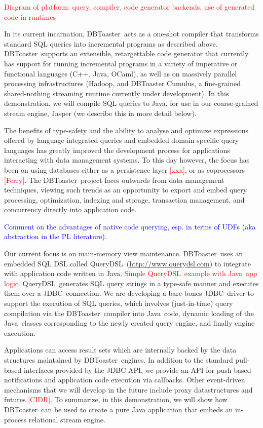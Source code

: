 \documentclass{vldb}
\newcommand{\tinysection}[1]{\noindent{\bf #1.}}
\newcommand{\todo}[1]{\textcolor{red}{#1}}
\newcommand{\note}[1]{\textcolor{blue}{#1}}
\newcommand{\compiler}{DBToaster}
\newcommand{\driver}{JDBC}
\newcommand{\targetlang}{Java}
\newcommand{\dsl}{QueryDSL}
\newcommand{\dslurl}{\url{http://www.querydsl.com}}
\begin{document}
\todo{Diagram of platform: query, compiler, code generator backends, use of
generated code in runtimes}

In its current incarnation, \compiler\ acts as a one-shot compiler that
transforms standard SQL queries into incremental programs as described above.
\compiler\ supports an extensible, retargettable code generator that currently
has support for running incremental programs in a variety of imperative or
functional languages (C++, Java, OCaml), as well as on massively parallel
processing infrastructures (Hadoop, and DBToaster Cumulus, a fine-grained
shared-nothing streaming runtime currently under development). In this
demonstration, we will compile SQL queries to Java, for use in our
coarse-grained stream engine, Jasper (we describe this in more detail below).


\tinysection{Programming with DBToaster} 
The benefits of type-safety and the ability to analyse and optimize expressions
offered by language integrated queries and embedded domain specific query
languages has greatly improved the development process for applications
interacting with data management systems. To this day however, the focus has
been on using databases either as a persistence layer \todo{[xxx]}, or as
coprocessors \todo{[Ferry]}. The \compiler\ project faces outwards from data
management techniques, viewing such trends as an opportunity to export
and embed query processing, optimization, indexing and storage,
transaction management, and concurrency directly into application code.

\note{Comment on the advantages of native code querying, esp. in terms of UDFs
(aka abstraction in the PL literature).}


Our current focus is on main-memory view maintenance. \compiler\ uses an
embedded SQL DSL called \dsl\ (\dslurl) to integrate with application code
written in \targetlang.
\todo{Simple \dsl\ example with \targetlang\ app logic.}
\dsl\ generates SQL query strings in a type-safe manner and executes them
over a \driver\ connection. We are developing a bare-bones \driver\ driver to
support the execution of SQL queries, which involves (just-in-time) query
compilation via the \compiler\ compiler into \targetlang\ code, dynamic loading
of the \targetlang\ classes corresponding to the newly created query engine, and
finally engine execution.


Applications can access
result sets which are internally backed by the data structures maintained by
\compiler\ engines. In addition to the standard pull-based interfaces provided
by the JDBC API, we provide an API for push-based notifications and application
code execution via callbacks. Other event-driven mechanisms that we will develop
in the future include proxy datastructures and futures \todo{[CIDR]}. To
summarize, in this demonstration, we will show how \compiler\ can be used to
create a pure Java application that embeds an in-process relational stream
engine.
\end{document}
